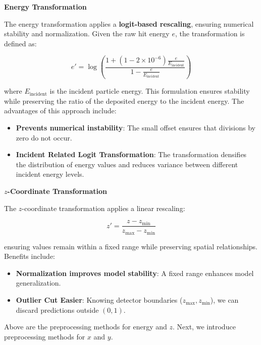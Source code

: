 \noindent
\textbf{Energy Transformation}

The energy transformation applies a \textbf{logit-based rescaling}, ensuring numerical stability and normalization. Given the raw hit energy \( e \), the transformation is defined as:

\begin{equation}
e' = \log \left( \frac{1 + (1 - 2\times10^{-6}) \frac{e}{E_{\text{incident}} }}{1 - \frac{e}{E_{\text{incident}} }} \right)
\end{equation}

where \( E_{\text{incident}} \) is the incident particle energy. This formulation ensures stability while preserving the ratio of the deposited energy to the incident energy. The advantages of this approach include:

\begin{itemize}
    \item \textbf{Prevents numerical instability}: The small offset ensures that divisions by zero do not occur.
    \item \textbf{Incident Related Logit Transformation}: The transformation densifies the distribution of energy values and reduces variance between different incident energy levels.
\end{itemize}

\noindent
\textbf{\( z \)-Coordinate Transformation}  

The \( z \)-coordinate transformation applies a linear rescaling:

\begin{equation}
z' = \frac{z - z_{\min}}{z_{\max} - z_{\min}}
\end{equation}

ensuring values remain within a fixed range while preserving spatial relationships. Benefits include:

\begin{itemize}
    \item \textbf{Normalization improves model stability}: A fixed range enhances model generalization.
    \item \textbf{Outlier Cut Easier}: Knowing detector boundaries (\( z_{\max}, z_{\min} \)), we can discard predictions outside \( (0,1) \).
\end{itemize}

Above are the preprocessing methods for energy and \( z \). Next, we introduce preprocessing methods for \( x \) and \( y \).


